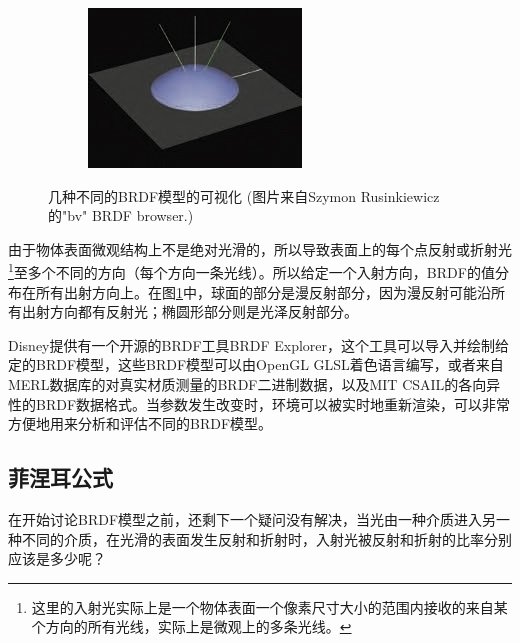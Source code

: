 \begin{figure}
\begin{fullwidth}
\begin{center}
\begin{subfigure}[b]{0.328\thewidth}
	\end{subfigure}
	\begin{subfigure}[b]{0.328\thewidth}
		\includegraphics[width=1.\textwidth]{graphics/gi/ray-optics-8-6}
	\end{subfigure}
\caption{几种不同的BRDF模型的可视化 (图片来自Szymon Rusinkiewicz的"bv" BRDF browser.)}
\label{f:intro-brdf-models}
\end{center}
\end{fullwidth}
\end{figure}

由于物体表面微观结构上不是绝对光滑的，所以导致表面上的每个点反射或折射光\footnote{这里的入射光实际上是一个物体表面一个像素尺寸大小的范围内接收的来自某个方向的所有光线，实际上是微观上的多条光线。}至多个不同的方向（每个方向一条光线）。所以给定一个入射方向，BRDF的值分布在所有出射方向上。在图\ref{f:intro-brdf-models}中，球面的部分是漫反射部分，因为漫反射可能沿所有出射方向都有反射光；椭圆形部分则是光泽反射部分。

Disney提供有一个开源的BRDF工具BRDF Explorer\cite{m:BRDFExplorer}，这个工具可以导入并绘制给定的BRDF模型，这些BRDF模型可以由OpenGL GLSL着色语言编写，或者来自MERL数据库的对真实材质测量的BRDF二进制数据，以及MIT CSAIL的各向异性的BRDF数据格式。当参数发生改变时，环境可以被实时地重新渲染，可以非常方便地用来分析和评估不同的BRDF模型。





\subsection{菲涅耳公式}\label{sec:intro-fresnel}
在开始讨论BRDF模型之前，还剩下一个疑问没有解决，当光由一种介质进入另一种不同的介质，在光滑的表面发生反射和折射时，入射光被反射和折射的比率分别应该是多少呢？

